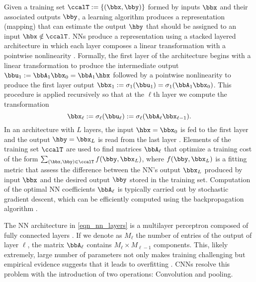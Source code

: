 
%
Given a training set $\ccalT := \{(\bbx,\bby)\}$ formed by inputs $\bbx$ and their associated outputs $\bby$, a learning algorithm produces a representation (mapping) that can estimate the output $\hby$ that should be assigned to an input $\hbx\notin\ccalT$. NNs produce a representation using a stacked layered architecture in which each layer composes a linear transformation with a pointwise nonlinearity \cite{goodfellow16-deeplearn}. Formally, the first layer of the architecture begins with a linear transformation to produce the intermediate output $\bbu_1 := \bbA_{1}\bbx_{0} = \bbA_{1}\hbx$ followed by a pointwise nonlinearity to produce the first layer output $\bbx_1 := \sigma_1(\bbu_1) = \sigma_1(\bbA_{1}\bbx_0)$. This procedure is applied recursively so that at the $\ell$th layer we compute the transformation
%
\begin{equation}\label{eqn_nn_layers}
    \bbx_\ell := \sigma_\ell(\bbu_\ell) := \sigma_\ell(\bbA_{\ell}\bbx_{\ell-1}).
\end{equation}
%
In an architecture with $L$ layers, the input $\hbx=\bbx_0$ is fed to the first layer and the output $\hby = \bbx_L$ is read from the last layer \cite{kuo17-recos}. Elements of the training set $\ccalT$ are used to find matrices $\bbA_{\ell}$ that optimize a training cost of the form $\sum_{(\bbx,\bby)\in\ccalT} f(\bby, \bbx_L)$, where $f(\bby, \bbx_L)$ is a fitting metric that assess the difference between the NN's output $\bbx_L$ produced by input $\bbx$ and the desired output $\bby$ stored in the training set. Computation of the optimal NN coefficients $\bbA_\ell$ is typically carried out by stochastic gradient descent, which can be efficiently computed using the backpropagation algorithm \cite{rumelhart86-backprop}.

The NN architecture in \eqref{eqn_nn_layers} is a multilayer perceptron composed of fully connected layers \cite{kuo17-recos}. If we denote as $M_\ell$ the number of entries of the output of layer $\ell$, the matrix $\bbA_{\ell}$ contains $M_{\ell}\times M_{\ell-1}$ components. This, likely extremely, large number of parameters not only makes training challenging but empirical evidence suggests that it leads to overfitting \cite{huang17-densecnn}. CNNs resolve this problem with the introduction of two operations: Convolution and pooling.

